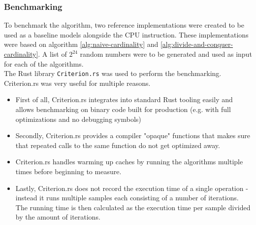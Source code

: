 \subsubsection{Benchmarking}
To benchmark the algorithm, two reference implementations were created to be used as a baseline models alongside the CPU instruction. These implementations were based on algorithm \ref{alg:naive-cardinality} and \ref{alg:divide-and-conquer-cardinality}. A list of $2^{24}$ random numbers were to be generated and used as input for each of the algorithms.\\
The Rust library \texttt{Criterion.rs} \cite{criterion} was used to perform the benchmarking. Criterion.rs was very useful for multiple reasons. 
\begin{itemize}
    \item First of all, Criterion.rs integrates into standard Rust tooling easily and allows benchmarking on binary code built for production (e.g. with full optimizations and no debugging symbols)
    \item Secondly, Criterion.rs provides a compiler "opaque" functions that makes sure that repeated calls to the same function do not get optimized away.
    \item Criterion.rs handles warming up caches by running the algorithms multiple times before beginning to measure.
    \item Lastly, Criterion.rs does not record the execution time of a single operation - instead it runs multiple samples each consisting of a number of iterations. The running time is then calculated as the execution time per sample divided by the amount of iterations. 
\end{itemize}
